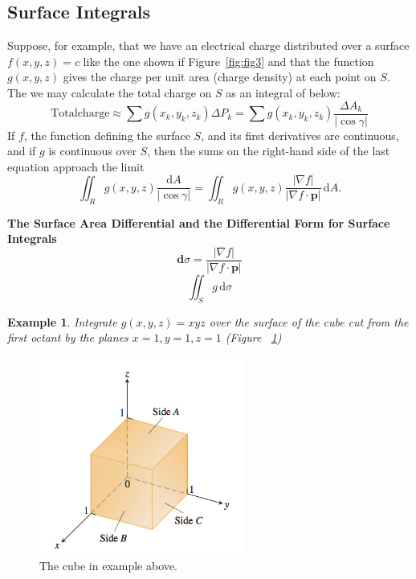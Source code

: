 \documentclass[a4paper,12pt]{article}
\newtheorem{example}{Example}             %
\begin{document}
\begin{CJK}{UTF8}{gbsn}
\subsection{Surface Integrals}
Suppose, for example, that we have an electrical charge distributed 
over a surface $f(x,y,z) = c$ like the one shown if Figure~\ref{fig:fig3}
and that the function $g(x,y,z)$ gives the charge per unit area (charge 
density) at each point on $S$. The we may calculate the total charge on 
$S$ as an integral of below:
\[
    \mathrm{Total charge} \approx \sum g(x_k, y_k, z_k)\Delta P_k = \sum g(x_k, y_k, z_k) 
    \frac{\Delta A_k}{\left|\cos \gamma \right|}
    \]
If $f$, the function defining the surface $S$, and its first derivatives 
are continuous, and if $g$ is continuous over $S$, then the sums on the 
right-hand side of the last equation approach the limit
\begin{equation}
    \iint_R g(x,y,z)\frac{\mathrm{d}A}{\left|\cos \gamma \right|}
    = \iint_R g(x,y,z) \frac{\left|\nabla f \right|}{\left|\nabla f \cdot \bm{p}\right |}\,\mathrm{d}A.
    \label{eq:eq10}
\end{equation}

\textbf{The Surface Area Differential and the Differential Form for Surface Integrals}
\[
    \bm{d}\sigma  = \frac{\left|\nabla f\right|}{\left|\nabla f \cdot \bm{p} \right|}
    \]
\[
    \iint_S g \, \mathrm{d}\sigma
    \]

\begin{example}
    Integrate $g(x,y,z)=xyz$ over the surface of the cube cut from 
    the first octant by the planes $x = 1, y = 1, z = 1$
    (Figure ~\ref{fig:fig5})
\end{example}
\begin{figure}[htbp]
    \centering
    \includegraphics[height=0.6\textwidth, width=0.6\textwidth]{surface3.png}
    \caption{The cube in example above.}
    \label{fig:fig5}
\end{figure}


\end{CJK}
\end{document}
